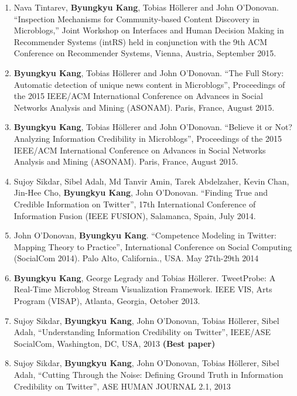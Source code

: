 \documentclass[10pt]{article}
\makeatletter
\newlength{\bibhang}
\newlength{\bibsep}
 {\@listi \global\bibsep\itemsep \global\advance\bibsep by\parsep}
\newenvironment{bibsection}%
        {\begin{enumerate}{}{%
       \setlength{\leftmargin}{\bibhang}%
       \setlength{\itemindent}{-\leftmargin}%
       \setlength{\itemsep}{\bibsep}%
       \setlength{\parsep}{\z@}%
        \setlength{\partopsep}{0pt}%
        \setlength{\topsep}{0pt}}}
        {\end{enumerate}\vspace{-.6\baselineskip}}
\makeatother
\begin{document}
\begin{bibsection}
   \item[--] Nava Tintarev, {\bf Byungkyu Kang}, Tobias H{\"o}llerer and John O'Donovan. ``Inspection Mechanisms for Community-based Content Discovery in Microblogs,'' Joint Workshop on Interfaces and Human Decision Making in Recommender Systems (intRS) held in conjunction with the 9th ACM Conference on Recommender Systems, Vienna, Austria, September 2015.
   
   \item[--] {\bf Byungkyu Kang}, Tobias H{\"o}llerer and John O'Donovan. ``The Full Story: Automatic detection of unique news content in Microblogs'', Proceedings of the 2015 IEEE/ACM International Conference on Advances in Social Networks Analysis and Mining (ASONAM). Paris, France, August 2015.
   
   \item[--] {\bf Byungkyu Kang}, Tobias H{\"o}llerer and John O'Donovan. ``Believe it or Not? Analyzing Information Credibility in Microblogs'', Proceedings of the 2015 IEEE/ACM International Conference on Advances in Social Networks Analysis and Mining (ASONAM). Paris, France, August 2015.
   
   \item[--] Sujoy Sikdar, Sibel Adal\i, Md Tanvir Amin, Tarek Abdelzaher, Kevin Chan, Jin-Hee Cho, {\bf Byungkyu Kang}, John O'Donovan. ``Finding True and Credible Information on Twitter'', 17th International Conference of Information Fusion (IEEE FUSION), Salamanca, Spain, July 2014.
   
   \item[--] John O'Donovan, {\bf Byungkyu Kang}. ``Competence Modeling in Twitter: Mapping Theory to Practice'', International Conference on Social Computing (SocialCom 2014). Palo Alto, California., USA. May 27th-29th 2014
   
   \item[--] {\bf Byungkyu Kang}, George Legrady and Tobias H{\"o}llerer. TweetProbe: A Real-Time Microblog Stream Visualization Framework. IEEE VIS, Arts Program (VISAP), Atlanta, Georgia, October 2013.
   
   \item[--] Sujoy Sikdar, {\bf Byungkyu Kang}, John O'Donovan, Tobias H{\"o}llerer, Sibel Adal\i, ``Understanding Information Credibility on Twitter'', IEEE/ASE SocialCom, Washington, DC, USA, 2013 {\bf (Best paper)}
   
   \item[--] Sujoy Sikdar, {\bf Byungkyu Kang}, John O'Donovan, Tobias H{\"o}llerer, Sibel Adal\i, ``Cutting Through the Noise: Defining Ground Truth in Information Credibility on Twitter'', ASE HUMAN JOURNAL 2.1, 2013
   

\end{bibsection}
\end{document}
